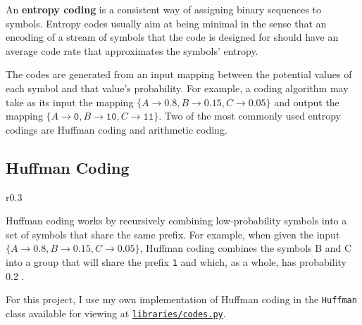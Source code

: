 An \textbf{entropy coding} is a consistent way of assigning binary sequences to symbols. Entropy codes usually aim at being minimal in the sense that an encoding of a stream of symbols that the code is designed for should have an average code rate that approximates the symbols' entropy.

The codes are generated from an input mapping between the potential values of each symbol and that value's probability. For example, a coding algorithm may take as its input the mapping $\{A \rightarrow 0.8, B \rightarrow 0.15, C \rightarrow 0.05\}$ and output the mapping $\{A \rightarrow \texttt{0}, B \rightarrow \texttt{10}, C \rightarrow \texttt{11}\}$. Two of the most commonly used entropy codings are Huffman coding and arithmetic coding.

\subsection{Huffman Coding}

\begin{wrapfigure}{r}{0.3\textwidth}
    \centering
\end{wrapfigure}

Huffman coding works by recursively combining low-probability symbols into a set of symbols that share the same prefix. For example, when given the input $\{A \rightarrow 0.8, B \rightarrow 0.15, C \rightarrow 0.05\}$, Huffman coding combines the symbols B and C into a group that will share the prefix \texttt{1} and which, as a whole, has probability 0.2 .

For this project, I use my own implementation of Huffman coding in the \texttt{Huffman} class available for viewing at \texttt{\href{https://github.com/Guy29/FYP/blob/main/Code/libraries/codes.py}{libraries/codes.py}}.

